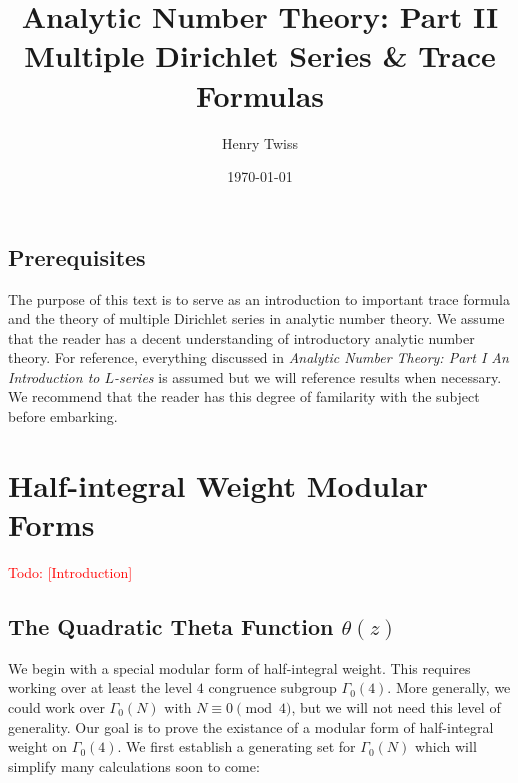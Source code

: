 \documentclass[12pt]{book}
\title{Analytic Number Theory: Part II \\  Multiple Dirichlet Series \& Trace Formulas}
\author{Henry Twiss}
\date{\today}
\theoremstyle{definition}\newframedtheorem{method}{Method}
\renewcommand{\t}{\theta}
\newcommand{\G}{\Gamma}
\newcommand{\<}{\langle}
\renewcommand{\>}{\rangle}
\newcommand{\todo}[1]{\textcolor{red}{\sf Todo: [#1]}}
\begin{document}
\maketitle
\thispagestyle{fancy}

\newpage

\section*{Prerequisites}
  The purpose of this text is to serve as an introduction to important trace formula and the theory of multiple Dirichlet series in analytic number theory. We assume that the reader has a decent understanding of introductory analytic number theory. For reference, everything discussed in \textit{Analytic Number Theory: Part I An Introduction to $L$-series} is assumed but we will reference results when necessary. We recommend that the reader has this degree of familarity with the subject before embarking.

\newpage

\tableofcontents

\newpage

\chapter{Half-integral Weight Modular Forms}
  \todo{Introduction}
  \section{The Quadratic Theta Function \texorpdfstring{$\t(z)$}{O(z)}}
    We begin with a special modular form of half-integral weight. This requires working over at least the level $4$ congruence subgroup $\G_{0}(4)$. More generally, we could work over $\G_{0}(N)$ with $N \equiv 0 \pmod{4}$, but we will not need this level of generality. Our goal is to prove the existance of a modular form of half-integral weight on $\G_{0}(4)$. We first establish a generating set for $\G_{0}(N)$ which will simplify many calculations soon to come:
\end{document}
